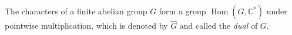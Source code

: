 The characters of a finite abelian group $G$ form a group $\operatorname{Hom}(G, \mathbb{C}^*)$ under pointwise multiplication, which is denoted by $\widehat{G}$ and called the \emph{dual} of $G$.
